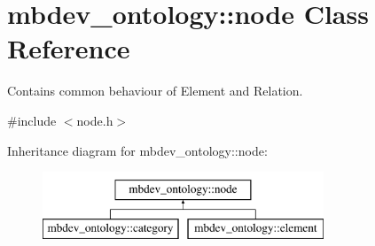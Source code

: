 \hypertarget{classmbdev__ontology_1_1node}{\section{mbdev\-\_\-ontology\-:\-:node \-Class \-Reference}
\label{classmbdev__ontology_1_1node}
}


\-Contains common behaviour of \-Element and \-Relation.  




{\ttfamily \#include $<$node.\-h$>$}

\-Inheritance diagram for mbdev\-\_\-ontology\-:\-:node\-:\begin{figure}[H]
\begin{center}
\leavevmode
\includegraphics[height=2.000000cm]{classmbdev__ontology_1_1node}
\end{center}
\end{figure}
